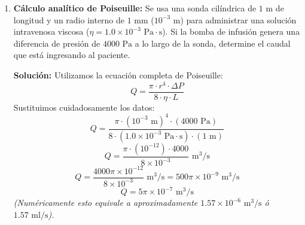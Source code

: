 \documentclass[12pt,letterpaper]{article}
\begin{document}
\begin{enumerate}
    \textbf{Solución:}
    Por analogía con la ley de Ohm para fluidos, $\Delta P = Q \cdot R_h$, despejamos la resistencia:
    \[
    R_h = \frac{\Delta P}{Q}
    \]
    \[
    R_h = \frac{2000 \text{ Pa}}{5 \times 10^{-6} \text{ m}^3\text{/s}} = 400 \times 10^6 \text{ Pa}\cdot\text{s/m}^3
    \]
    \[
    R_h = 4 \times 10^8 \text{ Pa}\cdot\text{s/m}^3
    \]

    \vspace{0.3cm}
    \item \textbf{Cálculo analítico de Poiseuille:} Se usa una sonda cilíndrica de $1 \text{ m}$ de longitud y un radio interno de $1 \text{ mm}$ ($10^{-3} \text{ m}$) para administrar una solución intravenosa viscosa ($\eta = 1.0 \times 10^{-3} \text{ Pa}\cdot\text{s}$). Si la bomba de infusión genera una diferencia de presión de $4000 \text{ Pa}$ a lo largo de la sonda, determine el caudal que está ingresando al paciente.

    \textbf{Solución:}
    Utilizamos la ecuación completa de Poiseuille:
    \[
    Q = \frac{\pi \cdot r^4 \cdot \Delta P}{8 \cdot \eta \cdot L}
    \]
    Sustituimos cuidadosamente los datos:
    \[
    Q = \frac{\pi \cdot (10^{-3} \text{ m})^4 \cdot (4000 \text{ Pa})}{8 \cdot (1.0 \times 10^{-3} \text{ Pa}\cdot\text{s}) \cdot (1 \text{ m})}
    \]
    \[
    Q = \frac{\pi \cdot (10^{-12}) \cdot 4000}{8 \times 10^{-3}} \text{ m}^3\text{/s}
    \]
    \[
    Q = \frac{4000\pi \times 10^{-12}}{8 \times 10^{-3}} \text{ m}^3\text{/s} = 500\pi \times 10^{-9} \text{ m}^3\text{/s}
    \]
    \[
    Q = 5\pi \times 10^{-7} \text{ m}^3\text{/s}
    \]
    \textit{(Numéricamente esto equivale a aproximadamente $1.57 \times 10^{-6} \text{ m}^3\text{/s}$ ó $1.57 \text{ ml/s}$).}

\end{enumerate}
\end{document}
